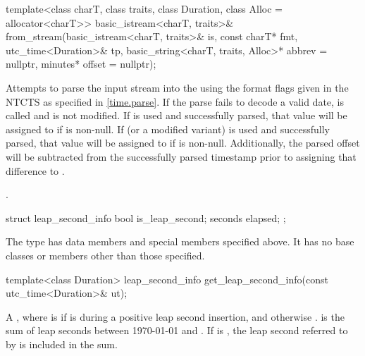 %
\begin{itemdecl}
template<class charT, class traits, class Duration, class Alloc = allocator<charT>>
  basic_istream<charT, traits>&
    from_stream(basic_istream<charT, traits>& is, const charT* fmt,
                utc_time<Duration>& tp, basic_string<charT, traits, Alloc>* abbrev = nullptr,
                minutes* offset = nullptr);
\end{itemdecl}

\begin{itemdescr}
\pnum
\effects
Attempts to parse the input stream 
into the   using
the format flags given in the NTCTS 
as specified in \ref{time.parse}.
If the parse fails to decode a valid date,
 is called and
 is not modified.
If  is used and successfully parsed,
that value will be assigned to  if  is non-null.
If  (or a modified variant) is used and successfully parsed,
that value will be assigned to  if  is non-null.
Additionally, the parsed offset will be subtracted from
the successfully parsed timestamp
prior to assigning that difference to .

\pnum
\returns
{}.
\end{itemdescr}

%
\begin{itemdecl}
struct leap_second_info {
  bool    is_leap_second;
  seconds elapsed;
};
\end{itemdecl}

\begin{itemdescr}
\pnum
The type 
has data members and special members specified above.
It has no base classes or members other than those specified.
\end{itemdescr}

%
\begin{itemdecl}
template<class Duration>
  leap_second_info get_leap_second_info(const utc_time<Duration>& ut);
\end{itemdecl}

\begin{itemdescr}
\pnum
\returns
A  ,
where  is 
if  is during a positive leap second insertion, and
otherwise .
 is the sum of leap seconds between 1970-01-01 and .
If  is ,
the leap second referred to by  is included in the sum.
\end{itemdescr}

